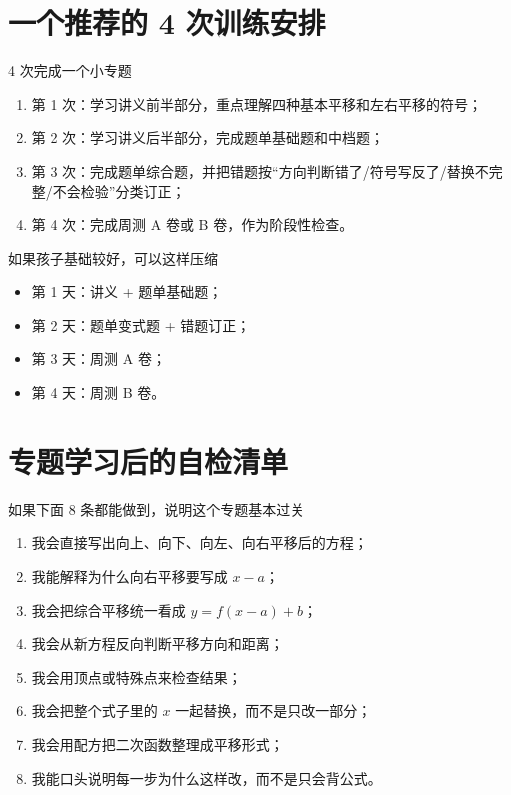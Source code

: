 \documentclass[11pt,a4paper,fontset=fandol]{ctexart}
\begin{document}
\section{一个推荐的 4 次训练安排}

\begin{goalbox}{4 次完成一个小专题}
\begin{enumerate}
  \item 第 1 次：学习讲义前半部分，重点理解四种基本平移和左右平移的符号；
  \item 第 2 次：学习讲义后半部分，完成题单基础题和中档题；
  \item 第 3 次：完成题单综合题，并把错题按“方向判断错了/符号写反了/替换不完整/不会检验”分类订正；
  \item 第 4 次：完成周测 A 卷或 B 卷，作为阶段性检查。
\end{enumerate}
\end{goalbox}

\begin{infobox}{如果孩子基础较好，可以这样压缩}
\begin{itemize}
  \item 第 1 天：讲义 + 题单基础题；
  \item 第 2 天：题单变式题 + 错题订正；
  \item 第 3 天：周测 A 卷；
  \item 第 4 天：周测 B 卷。
\end{itemize}
\end{infobox}

\section{专题学习后的自检清单}

\begin{goalbox}{如果下面 8 条都能做到，说明这个专题基本过关}
\begin{enumerate}
  \item 我会直接写出向上、向下、向左、向右平移后的方程；
  \item 我能解释为什么向右平移要写成 $x-a$；
  \item 我会把综合平移统一看成 $y=f(x-a)+b$；
  \item 我会从新方程反向判断平移方向和距离；
  \item 我会用顶点或特殊点来检查结果；
  \item 我会把整个式子里的 $x$ 一起替换，而不是只改一部分；
  \item 我会用配方把二次函数整理成平移形式；
  \item 我能口头说明每一步为什么这样改，而不是只会背公式。
\end{enumerate}
\end{goalbox}
\end{document}
